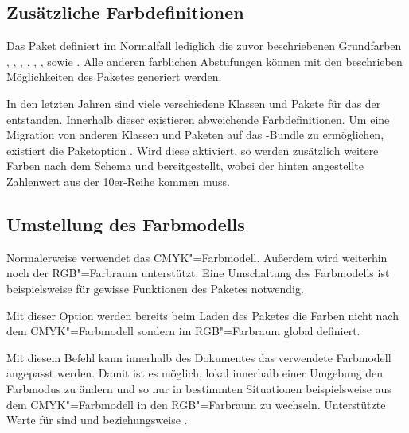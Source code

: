 \subsection{Zusätzliche Farbdefinitionen}
Das Paket  definiert im Normalfall lediglich die zuvor 
beschriebenen Grundfarben , , , 
, , ,  sowie 
. Alle anderen farblichen Abstufungen können mit den beschrieben 
Möglichkeiten des Paketes  generiert werden.

\begin{Declaration}{}
\printdeclarationlist%
%
In den letzten Jahren sind viele verschiedene Klassen und Pakete für das \CD 
der \TnUD entstanden. Innerhalb dieser existieren abweichende Farbdefinitionen. 
Um eine Migration von anderen Klassen und Paketen auf das \TUDScript-Bundle zu 
ermöglichen, existiert die Paketoption . Wird diese aktiviert, so 
werden zusätzlich weitere Farben nach dem Schema  
und  bereitgestellt, wobei der hinten angestellte 
Zahlenwert aus der 10er-Reihe kommen muss.
\end{Declaration}



\subsection{Umstellung des Farbmodells}
%
Normalerweise verwendet  das CMYK"=Farbmodell. Außerdem 
wird weiterhin noch der RGB"=Farbraum unterstützt. Eine Umschaltung des 
Farbmodells ist beispielsweise für gewisse Funktionen des Paketes 
 notwendig.

\begin{Declaration}{}
\printdeclarationlist%
%
Mit dieser Option werden bereits beim Laden des Paketes  
die Farben nicht nach dem CMYK"=Farbmodell sondern im RGB"=Farbraum global 
definiert.
\end{Declaration}

\begin{Declaration}{}
\printdeclarationlist%
%
Mit diesem Befehl kann innerhalb des Dokumentes das verwendete Farbmodell 
angepasst werden. Damit ist es möglich, lokal innerhalb einer Umgebung den 
Farbmodus zu ändern und so nur in bestimmten Situationen beispielsweise aus dem 
CMYK"=Farbmodell in den RGB"=Farbraum zu wechseln. Unterstützte Werte für 
 sind  und  beziehungsweise 
.
\end{Declaration}

